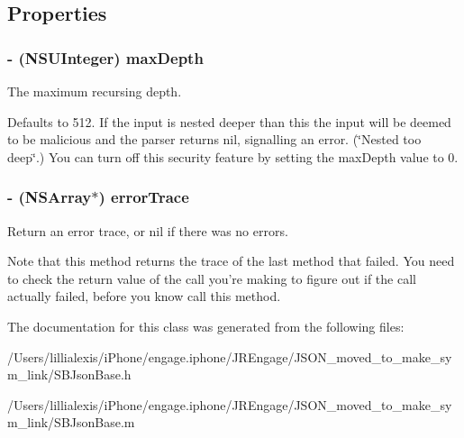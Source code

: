 \subsection{Properties}
\hypertarget{interface_s_b_json_base_abe3e47517711570a9a57e2d92a15055b}{
\subsubsection[{maxDepth}]{\setlength{\rightskip}{0pt plus 5cm}-\/ (NSUInteger) maxDepth}}
\label{interface_s_b_json_base_abe3e47517711570a9a57e2d92a15055b}


The maximum recursing depth. 

Defaults to 512. If the input is nested deeper than this the input will be deemed to be malicious and the parser returns nil, signalling an error. (\char`\"{}Nested too deep\char`\"{}.) You can turn off this security feature by setting the maxDepth value to 0. \hypertarget{interface_s_b_json_base_aa83f0ee5efade2fd26ddf6591ffd8dc0}{
\subsubsection[{errorTrace}]{\setlength{\rightskip}{0pt plus 5cm}-\/ (NSArray$\ast$) errorTrace}}
\label{interface_s_b_json_base_aa83f0ee5efade2fd26ddf6591ffd8dc0}


Return an error trace, or nil if there was no errors. 

Note that this method returns the trace of the last method that failed. You need to check the return value of the call you're making to figure out if the call actually failed, before you know call this method. 

The documentation for this class was generated from the following files:\begin{DoxyCompactItemize}
\item 
/Users/lillialexis/iPhone/engage.iphone/JREngage/JSON\_\-moved\_\-to\_\-make\_\-sym\_\-link/SBJsonBase.h\item 
/Users/lillialexis/iPhone/engage.iphone/JREngage/JSON\_\-moved\_\-to\_\-make\_\-sym\_\-link/SBJsonBase.m\end{DoxyCompactItemize}
